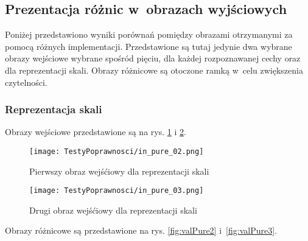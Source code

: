 \subsection{Prezentacja różnic w~obrazach wyjściowych}
\label{subsec:prezentacjaObrazowRoznicowych}

Poniżej przedstawiono wyniki porównań pomiędzy obrazami otrzymanymi za pomocą różnych implementacji. Przedstawione są tutaj jedynie dwa wybrane obrazy wejściowe wybrane spośród pięciu, dla każdej rozpoznawanej cechy oraz dla reprezentacji skali. Obrazy różnicowe są otoczone ramką w~celu zwiększenia czytelności.

\subsubsection{Reprezentacja skali}
\label{subsubsec:reprezentacjaSkaliRysunki}

Obrazy wejściowe przedstawione są na rys. \ref{fig:valPure02} i \ref{fig:valPure03}.

\begin{figure}
\begin{center}
\texttt{[image: TestyPoprawnosci/in\_pure\_02.png]}
\end{center}
\caption{Pierwszy obraz wejśćiowy dla reprezentacji skali}
\label{fig:valPure02}
\end{figure}

\begin{figure}
\begin{center}
\texttt{[image: TestyPoprawnosci/in\_pure\_03.png]}
\end{center}
\caption{Drugi obraz wejśćiowy dla reprezentacji skali}
\label{fig:valPure03}
\end{figure}

Obrazy różnicowe są przedstawione na rys. \ref{fig:valPure2} i~\ref{fig:valPure3}. 

